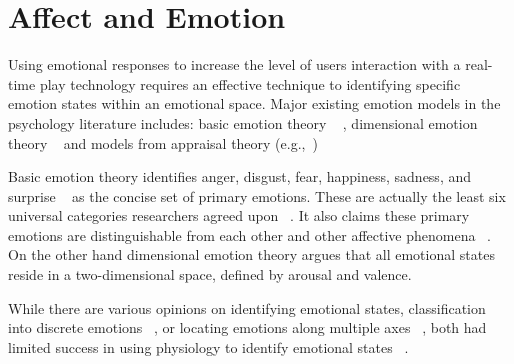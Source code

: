 


\section{Affect and Emotion}

Using emotional responses to increase the level of users interaction with a real-time 
play technology requires an effective technique to identifying specific emotion 
states within an emotional space. Major existing emotion models in the
psychology literature includes: basic emotion theory ~\cite{ekman1992argument, ekman1992there} ,
dimensional emotion theory ~\cite{lang1995emotion, russell1980circumplex} and models 
from appraisal theory (e.g.,~\cite{roseman2001model}) ~\cite{zhang2010service}

Basic emotion theory identifies anger, disgust, fear, happiness, sadness, and 
surprise ~\cite{peter2006emotion} as the concise set of primary
emotions. These are actually the least six universal categories researchers agreed 
upon ~\cite{zagalo2004story}. It also claims these
primary emotions are distinguishable from each other and
other affective phenomena ~\cite{dalgleish1999handbook}. On the other hand dimensional 
emotion theory argues that all emotional states reside
in a two-dimensional space, defined by arousal and valence.

While there are various opinions on identifying emotional
states, classification into discrete emotions ~\cite{dalgleish1999handbook}, or locating
emotions along multiple axes ~\cite{russell1989affect, lang1995emotion}, both 
had limited success in using physiology to identify 
emotional states ~\cite{cacioppo2000psychophysiology}.

